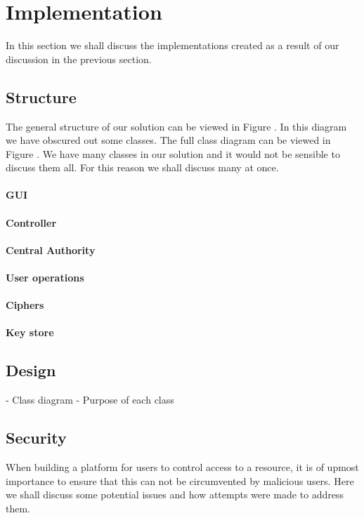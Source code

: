 \documentclass[12pt, titlepage]{article}
\begin{document}
\section{Implementation}
In this section we shall discuss the implementations created as a result of our discussion in the previous section.
\subsection{Structure}
The general structure of our solution can be viewed in Figure . In this diagram we have obscured out some classes. The full class diagram can be viewed in Figure .
\newline \indent We have many classes in our solution and it would not be sensible to discuss them all. For this reason we shall discuss many at once.

\paragraph*{GUI}
\paragraph*{Controller}
\paragraph*{Central Authority}
\paragraph*{User operations}
\paragraph*{Ciphers}
\paragraph*{Key store}


\subsection{Design}
- Class diagram
- Purpose of each class


\subsection{Security}
When building a platform for users to control access to a resource, it is of upmost importance to ensure that this can not be circumvented by malicious users. Here we shall discuss some potential issues and how attempts were made to address them.
\end{document}
